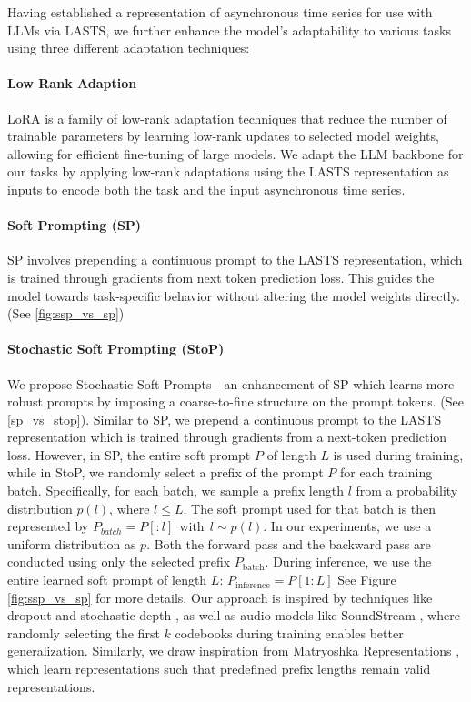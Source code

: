 Having established a representation of asynchronous time series for use with LLMs via LASTS, we further enhance the model's adaptability to various tasks using three different adaptation techniques: 

\paragraph{Low Rank Adaption} LoRA is a family of low-rank adaptation techniques that reduce the number of trainable parameters by learning low-rank updates to selected model weights, allowing for efficient fine-tuning of large models. We adapt the LLM backbone for our tasks by applying low-rank adaptations using the LASTS representation as inputs to encode both the task and the input asynchronous time series.

\paragraph{Soft Prompting (SP)} SP involves prepending a continuous prompt to the LASTS representation, which is trained through gradients from next token prediction loss. This guides the model towards task-specific behavior without altering the model weights directly. (See \autoref{fig:ssp_vs_sp})

\paragraph{Stochastic Soft Prompting (StoP)} We propose Stochastic Soft Prompts - an enhancement of SP which learns more robust prompts by imposing a coarse-to-fine structure on the prompt tokens. (See \autoref{sp_vs_stop}).  Similar to SP, we prepend a continuous prompt to the LASTS representation which is trained through gradients from a next-token prediction loss. However, in SP, the entire soft prompt $P$
of length  $L$ is used during training, while in StoP, we randomly select a prefix of the prompt $P$ for each training batch. Specifically, for each batch, we sample a prefix length $l$ from a probability distribution $p(l)$, where $l \leq L$. The soft prompt used for that batch is then represented by $P_{batch} = P[:l] \ \ \text{with} \ \ l \sim p(l)$. In our experiments, we use a uniform distribution as $p$. Both the forward pass and the backward pass are conducted using only the selected prefix $P_{\text{batch}}$. During inference, we use the entire learned soft prompt of length $L$:  $ P_{\text{inference}} = P[1:L] $
See Figure \ref{fig:ssp_vs_sp} for more details. {Our approach is inspired by techniques like dropout \citep{Srivastava2014Dropout} and stochastic depth \citep{huang2016deep}, as well as audio models like SoundStream \citep{Zeghidour2021SoundStream}, where randomly selecting the first $k$ codebooks during training enables better generalization. Similarly, we draw inspiration from Matryoshka Representations \citep{kusupati2022matryoshka}, which learn representations such that predefined prefix lengths remain valid representations.}

